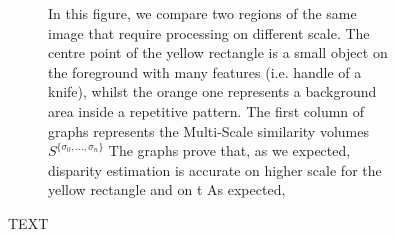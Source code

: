 \documentclass[10pt]{article}
\begin{document}
\begin{figure}[t]
{\begin{subfigure}[b]{1.15\textwidth}
        \vspace{-15pt}                
        \caption{In this figure, we compare two regions of the same image that require processing on different scale. The centre point of the yellow rectangle is a small object on the foreground with many features (i.e. handle of a knife), whilst the orange one represents a background area inside a repetitive pattern. The first column of graphs represents the Multi-Scale similarity volumes $S^{\{ \sigma_0, ..., \sigma_n \} }$ The graphs prove that, as we expected, disparity estimation is accurate on higher scale for the yellow rectangle and on t As expected,  }
    \end{subfigure} 
}
\vspace{-15pt}
\caption{TEXT}
\label{fig:multiscale_importance}  
\vspace{-3pt}      
\end{figure}
\end{document}
